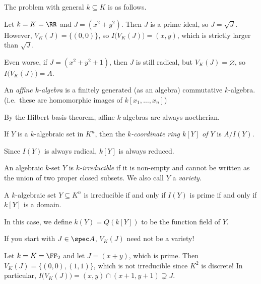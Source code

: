 The problem with general $k\subseteq K$ is as follows.
 \begin{example}
   Let $k=K=\RR$ and $J=(x^2+y^2)$. Then $J$ is a prime ideal, so $J=\sqrt J$. However,
   $V_K(J)=\{(0,0)\}$, so $I\bigl(V_K(J)\bigr)=(x,y)$, which is strictly larger than
   $\sqrt J$.

   Even worse, if $J=(x^2+y^2+1)$, then $J$ is still radical, but $V_K(J)=\varnothing$,
   so $I\bigl(V_K(J)\bigr)=A$.
 \end{example}
 \begin{definition}
   An \emph{affine $k$-algebra} is a finitely generated (as an algebra) commutative
   $k$-algebra. (i.e.\ these are homomorphic images of $k[x_1,\dots, x_n]$)
 \end{definition}
 By the Hilbert basis theorem, affine $k$-algebras are always noetherian.
 \begin{definition}
   If $Y$ is a $k$-algebraic set in $K^n$, then the \emph{$k$-coordinate ring $k[Y]$ of
   $Y$} is $A/I(Y)$.
 \end{definition}
 Since $I(Y)$ is always radical, $k[Y]$ is always reduced.
 \begin{definition}
   An algebraic $k$-set $Y$ is \emph{$k$-irreducible} if it is non-empty and cannot be
   written as the union of two proper closed subsets. We also call $Y$ a \emph{variety}.
 \end{definition}
 \begin{proposition}
   A $k$-algebraic set $Y\subseteq K^n$ is irreducible if and only if $I(Y)$ is prime if
   and only if $k[Y]$ is a domain.
 \end{proposition}
 In this case, we define $k(Y)=Q(k[Y])$ to be the function field of $Y$.
 \begin{warning}
   If you start with $J\in \spec A$, $V_K(J)$ need not be a variety!
 \begin{example}
   Let $k=K=\FF_2$ and let $J=(x+y)$, which is prime. Then $V_K(J)=\{(0,0),(1,1)\}$,
   which is not irreducible since $K^2$ is discrete! In particular,
   $I\bigl(V_K(J)\bigr)=(x,y)\cap (x+1,y+1)\supsetneq J$.
 \end{example}
 \end{warning}

